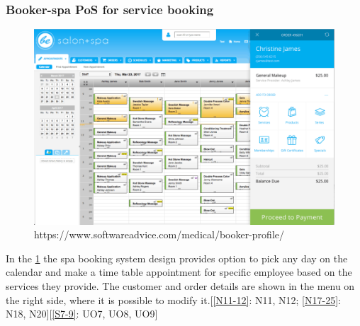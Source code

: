 \documentclass{article}
\begin{document}
\subsubsection{Booker-spa PoS for service booking}
\begin{figure}[H]
    \centering
    \includegraphics[width=0.9\linewidth]{HCI/images/spa.png}
    \caption{https://www.softwareadvice.com/medical/booker-profile/}
    \label{fig:cafeUI}
\end{figure}
 \noindent
 In the \cref{fig:cafeUI} the spa booking system design provides option to pick any day on the calendar and make a time table appointment for specific employee based on the services they provide. The customer and order details are shown in the menu on the right side, where it is possible to modify it.[\cref{N11-12}: N11, N12; \cref{N17-25}: N18, N20][\cref{S7-9}: UO7, UO8, UO9]
\end{document}
